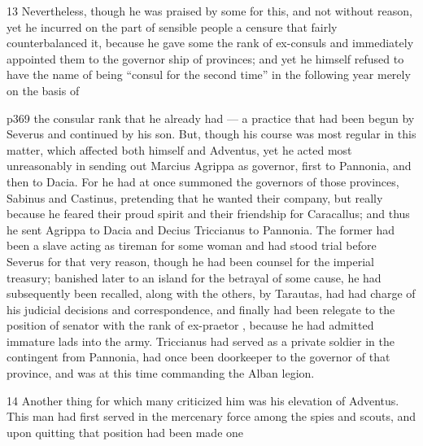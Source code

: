 13
Nevertheless, though he was praised by some for this, and not without reason, yet he incurred on the part of sensible people a censure that fairly counterbalanced it, because he gave some the rank of ex-consuls and immediately appointed them to the governor ­ship of provinces; and yet he himself refused to have the name of being ``consul for the second time'' in the following year merely on the basis of

p369 the consular rank that he already had \texthebrew{—} a practice that had been begun by Severus and continued by his son. But, though his course was most regular in this matter, which affected both himself and Adventus, yet he acted most unreasonably in sending out Marcius Agrippa as governor, first to Pannonia, and then to Dacia. For he had at once summoned the governors of those provinces, Sabinus and Castinus, pretending that he wanted their company, but really because he feared their proud spirit and their friendship for Caracallus; and thus he sent Agrippa to Dacia and Decius Triccianus to Pannonia. The former had been a slave acting as tireman for some woman and had stood trial before Severus for that very reason, though he had been counsel for the imperial treasury; banished later to an island for the betrayal of some cause, he had subsequently been recalled, along with the others, by Tarautas, had had charge of his judicial decisions and correspondence, and finally had been relegate to the position of senator with the rank of ex-praetor , because he had admitted immature lads into the army. Triccianus had served as a private soldier in the contingent from Pannonia, had once been doorkeeper to the governor of that province, and was at this time commanding the Alban legion.

14
Another thing for which many criticized him was his elevation of Adventus. This man had first served in the mercenary force among the spies and scouts, and upon quitting that position had been made one

